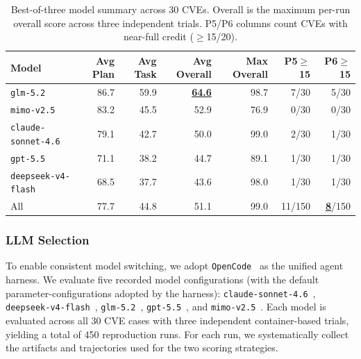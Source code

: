 \begin{table}[t]
\centering

\begin{tabular}{lrrrrrr}
\toprule
\textbf{Model} & \textbf{Avg Plan} & \textbf{Avg Task} & \textbf{Avg Overall} & \textbf{Max Overall} & \textbf{P5$\geq$15} & \textbf{P6$\geq$15} \\
\midrule
\texttt{glm-5.2} & 86.7 & 59.9 & \textbf{\underline{64.6}} & 98.7 & 7/30 & 5/30 \\
\texttt{mimo-v2.5} & 83.2 & 45.5 & 52.9 & 76.9 & 0/30 & 0/30 \\
\texttt{claude-sonnet-4.6} & 79.1 & 42.7 & 50.0 & 99.0 & 2/30 & 1/30 \\
\texttt{gpt-5.5} & 71.1 & 38.2 & 44.7 & 89.1 & 1/30 & 1/30 \\
\texttt{deepseek-v4-flash} & 68.5 & 37.7 & 43.6 & 98.0 & 1/30 & 1/30 \\
\midrule
All & 77.7 & 44.8 & 51.1 & 99.0 & 11/150 & \textbf{\underline{8}}/150 \\
\bottomrule
\end{tabular}
\caption{Best-of-three model summary across 30 CVEs. Overall is the maximum per-run overall score across three independent trials. P5/P6 columns count CVEs with near-full credit ($\geq$15/20).}
\label{tab:model-results}
\end{table}




\subsubsection{LLM Selection}
To enable consistent model switching, we adopt \texttt{OpenCode}~\cite{opencode_github} as the unified agent harness.
We evaluate five recorded model configurations (with the default parameter-configurations adopted by the harness): \texttt{claude-sonnet-4.6}~\cite{anthropic2026sonnet46}, \texttt{deepseek-v4-flash}~\cite{deepseekai2026deepseekv4}, \texttt{glm-5.2}~\cite{zeng2026glm5}, \texttt{gpt-5.5}~\cite{openai2026gpt55}, and \texttt{mimo-v2.5}~\cite{mimo2026v25pro}. Each model is evaluated across all 30 CVE cases with three independent container-based trials, yielding a total of 450 reproduction runs. For each run, we systematically collect the artifacts and trajectories used for the two scoring strategies.

